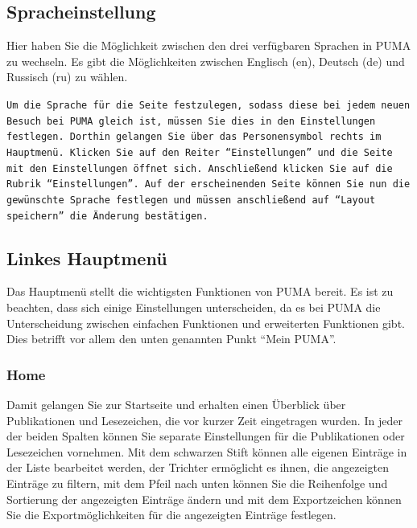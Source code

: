 \subsection{Spracheinstellung}
Hier haben Sie die Möglichkeit zwischen den drei verfügbaren Sprachen in PUMA zu wechseln. Es gibt die Möglichkeiten zwischen Englisch (en), Deutsch (de) und Russisch (ru) zu wählen.
\begin{mdframed}[style=mdfexample1,frametitle={\texttt{\textbf{TIPP}}},backgroundcolor=gray!40] \texttt{Um die Sprache für die Seite festzulegen, sodass diese bei jedem neuen Besuch bei PUMA gleich ist, müssen Sie dies in den Einstellungen festlegen. Dorthin gelangen Sie über das Personensymbol rechts im Hauptmenü. Klicken Sie auf den Reiter \enquote{Einstellungen} und die Seite mit den Einstellungen öffnet sich. Anschließend klicken Sie auf die Rubrik \enquote{Einstellungen}. Auf der erscheinenden Seite können Sie nun die gewünschte Sprache festlegen und müssen anschließend auf \enquote{Layout speichern} die Änderung bestätigen.}
\end{mdframed}
  

\subsection{Linkes Hauptmenü} 
Das Hauptmenü stellt die wichtigsten Funktionen von PUMA bereit. Es ist zu beachten, dass sich einige Einstellungen unterscheiden, da es bei PUMA die Unterscheidung zwischen einfachen Funktionen und erweiterten Funktionen gibt. Dies betrifft vor allem den unten genannten Punkt \enquote{Mein PUMA}. 
\subsubsection{Home}
Damit gelangen Sie zur Startseite und erhalten einen Überblick über Publikationen und Lesezeichen, die vor kurzer Zeit eingetragen wurden. In jeder der beiden Spalten können Sie separate Einstellungen für die Publikationen oder Lesezeichen vornehmen. Mit dem schwarzen Stift können alle eigenen Einträge in der Liste bearbeitet werden, der Trichter ermöglicht es ihnen, die angezeigten Einträge zu filtern, mit dem Pfeil nach unten können Sie die Reihenfolge und Sortierung der angezeigten Einträge ändern und mit dem Exportzeichen können Sie die Exportmöglichkeiten für die angezeigten Einträge festlegen.
